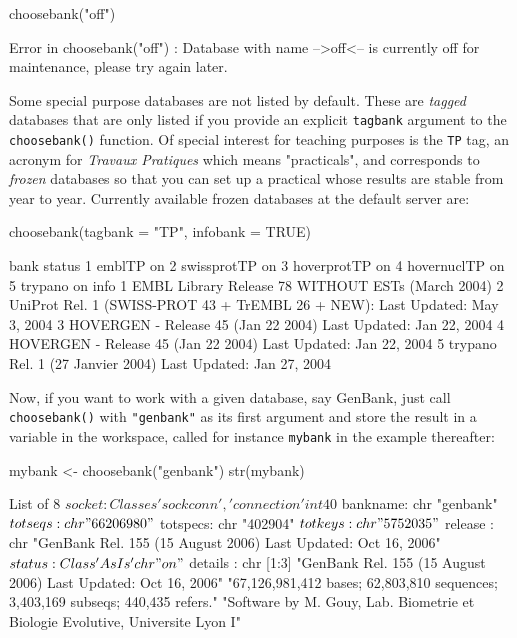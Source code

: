 \documentclass{article}
\begin{document}
%
%
\begin{Schunk}
\begin{Sinput}
 choosebank("off")
\end{Sinput}
\begin{Soutput}
Error in choosebank("off") : Database with name -->off<-- is currently off for maintenance, 
please try again later.
\end{Soutput}
\end{Schunk}

Some special purpose databases are not listed by default. These are \textit{tagged} databases
that are only listed if you provide an explicit \texttt{tagbank} argument to the \texttt{choosebank()}
function. Of special interest for teaching purposes is the \texttt{TP} tag, an acronym for
\textit{Travaux Pratiques} which means "practicals", and corresponds to \emph{frozen}
databases so that you can set up a practical whose results are stable from year to year. Currently
available frozen databases at the default server are:

\begin{Schunk}
\begin{Sinput}
 choosebank(tagbank = "TP", infobank = TRUE)
\end{Sinput}
\begin{Soutput}
         bank status
1      emblTP     on
2 swissprotTP     on
3 hoverprotTP     on
4 hovernuclTP     on
5     trypano     on
                                                                          info
1                           EMBL Library Release 78 WITHOUT ESTs  (March 2004)
2 UniProt Rel. 1 (SWISS-PROT 43 + TrEMBL 26 + NEW): Last Updated: May  3, 2004
3               HOVERGEN - Release 45 (Jan 22 2004) Last Updated: Jan 22, 2004
4               HOVERGEN - Release 45 (Jan 22 2004) Last Updated: Jan 22, 2004
5                  trypano Rel. 1 (27 Janvier 2004) Last Updated: Jan 27, 2004
\end{Soutput}
\end{Schunk}

Now, if you want to work with a given database, say GenBank, just call \texttt{choosebank()}
with \texttt{"genbank"} as its first argument and store the result in a variable
in the workspace, called for instance \texttt{mybank} in the example thereafter:

\begin{Schunk}
\begin{Sinput}
 mybank <- choosebank("genbank")
 str(mybank)
\end{Sinput}
\begin{Soutput}
List of 8
 $ socket  :Classes 'sockconn', 'connection'  int 40
 $ bankname: chr "genbank"
 $ totseqs : chr "66206980"
 $ totspecs: chr "402904"
 $ totkeys : chr "5752035"
 $ release : chr "GenBank Rel. 155 (15 August 2006) Last Updated: Oct 16, 2006"
 $ status  :Class 'AsIs'  chr "on"
 $ details : chr [1:3] "GenBank Rel. 155 (15 August 2006) Last Updated: Oct 16, 2006" "67,126,981,412 bases; 62,803,810 sequences; 3,403,169 subseqs; 440,435 refers." "Software by M. Gouy, Lab. Biometrie et Biologie Evolutive, Universite Lyon I"
\end{Soutput}
\end{Schunk}
\end{document}
